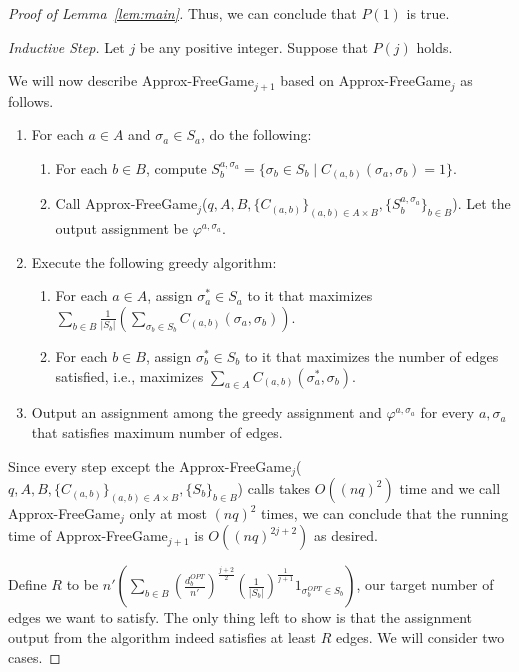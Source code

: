 \documentclass{article}
\begin{document}
\begin{proof}[Proof of Lemma~\ref{lem:main}]
Thus, we can conclude that $P(1)$ is true.

{\em Inductive Step.} Let $j$ be any positive integer. Suppose that $P(j)$ holds.

We will now describe {\sc Approx-FreeGame$_{j+1}$} based on {\sc Approx-FreeGame$_j$} as follows.

\begin{enumerate}
\item For each $a \in A$ and $\sigma_a \in S_a$, do the following:
  \begin{enumerate}
  \item For each $b \in B$, compute $S^{a, \sigma_a}_b = \{\sigma_b \in S_b \mid C_{(a, b)}(\sigma_a, \sigma_b) = 1\}$.
  \item Call {\sc Approx-FreeGame$_{j}$}($q, A, B, \{C_{(a, b)}\}_{(a, b) \in A \times B}, \{S^{a, \sigma_a}_b\}_{b \in B}$). Let the output assignment be $\varphi^{a, \sigma_a}$.
  \end{enumerate}
\item Execute the following greedy algorithm:
  \begin{enumerate}
  \item For each $a \in A$, assign $\sigma^*_a \in S_a$ to it that maximizes $\sum_{b \in B} \frac{1}{|S_b|}\left(\sum_{\sigma_b \in S_b} C_{(a, b)}(\sigma_a, \sigma_b)\right)$. \label{step:free-greedy}
  \item For each $b \in B$, assign $\sigma^*_b \in S_b$ to it that maximizes the number of edges satisfied, i.e., maximizes $\sum_{a \in A} C_{(a, b)}(\sigma^*_a, \sigma_b)$.
  \end{enumerate}
\item Output an assignment among the greedy assignment and $\varphi^{a, \sigma_a}$ for every $a, \sigma_a$ that satisfies maximum number of edges.
\end{enumerate}

Since every step except the {\sc Approx-FreeGame$_{j}$}($q, A, B, \{C_{(a, b)}\}_{(a, b) \in A \times B}, \{S_b\}_{b \in B}$) calls takes $O((nq)^2)$ time and we call {\sc Approx-FreeGame$_{j}$} only at most $(nq)^2$ times, we can conclude that the running time of {\sc Approx-FreeGame$_{j+1}$} is $O((nq)^{2j+2})$ as desired.

Define $R$ to be $n'\left(\sum_{b \in B} \left(\frac{d^{OPT}_b}{n'}\right)^\frac{j+2}{2}\left(\frac{1}{|S_b|}\right)^\frac{1}{j+1}1_{\sigma_b^{OPT} \in S_b}\right)$, our target number of edges we want to satisfy. The only thing left to show is that the assignment output from the algorithm indeed satisfies at least $R$ edges. We will consider two cases.


\end{proof}
\end{document}
